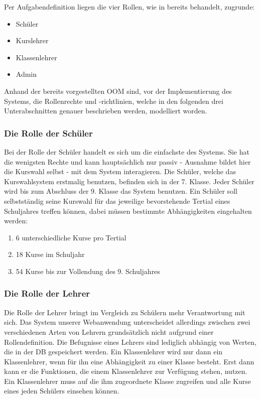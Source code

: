 Per Aufgabendefinition liegen die vier Rollen, wie in  bereits behandelt, zugrunde:

\begin{itemize}
  \item Schüler
  \item Kurslehrer
  \item Klassenlehrer
  \item Admin
\end{itemize}

Anhand der bereits vorgestellten \ac{OOM} sind, vor der Implementierung des Systems, die Rollenrechte und -richtlinien, welche in den folgenden drei Unterabschnitten genauer beschrieben werden, modelliert worden.

\subsubsection{Die Rolle der Schüler}

Bei der Rolle der Schüler handelt es sich um die einfachste des Systems. 
Sie hat die wenigsten Rechte und kann hauptsächlich nur passiv - Ausnahme bildet hier die Kurswahl selbst - mit dem System interagieren.
Die Schüler, welche das Kurswahlsystem erstmalig benutzen, befinden sich in der 7. Klasse. Jeder Schüler wird bis zum Abschluss der 9. Klasse das System benutzen.
Ein Schüler soll selbstständig seine Kurswahl für das jeweilige bevorstehende Tertial eines Schuljahres treffen können, dabei müssen bestimmte Abhängigkeiten eingehalten werden:

\begin{enumerate}
  \item 6 unterschiedliche Kurse pro Tertial
  \item 18 Kurse im Schuljahr
  \item 54 Kurse bis zur Vollendung des 9. Schuljahres
\end{enumerate}

\subsubsection{Die Rolle der Lehrer}

Die Rolle der Lehrer bringt im Vergleich zu Schülern mehr Verantwortung mit sich.
Das System unserer Webanwendung unterscheidet allerdings zwischen zwei verschiedenen Arten von Lehrern grundsätzlich nicht aufgrund einer Rollendefinition. 
Die Befugnisse eines Lehrers sind lediglich abhängig von Werten, die in der \ac{DB} gespeichert werden. 
Ein Klassenlehrer wird nur dann ein Klassenlehrer, wenn für ihn eine Abhängigkeit zu einer Klasse besteht. 
Erst dann kann er die Funktionen, die einem Klassenlehrer zur Verfügung stehen, nutzen.
Ein Klassenlehrer muss auf die ihm zugeordnete Klasse zugreifen und alle Kurse eines jeden Schülers einsehen können.

